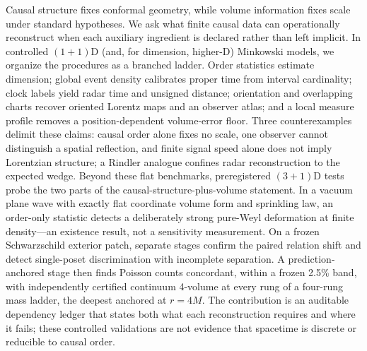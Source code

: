 


\begin{paperabstract}
Causal structure fixes conformal geometry, while volume information fixes
scale under standard hypotheses. We ask what finite causal data can
operationally reconstruct when each auxiliary ingredient is declared rather
than left implicit. In controlled $(1{+}1)$D (and, for dimension, higher-D)
Minkowski models, we organize the procedures as a branched ladder. Order
statistics estimate dimension; global event density calibrates proper time
from interval cardinality; clock labels yield radar time and unsigned
distance; orientation and overlapping charts recover oriented Lorentz maps
and an observer atlas; and a local measure profile removes a
position-dependent volume-error floor. Three counterexamples delimit these
claims: causal order alone fixes no scale, one observer cannot distinguish a
spatial reflection, and finite signal speed alone does not imply Lorentzian
structure; a Rindler analogue confines radar reconstruction to the expected
wedge. Beyond these flat benchmarks, preregistered $(3{+}1)$D tests probe the
two parts of the causal-structure-plus-volume statement. In a vacuum plane
wave with exactly flat coordinate volume form and sprinkling law, an
order-only statistic detects a deliberately strong pure-Weyl deformation at
finite density---an existence result, not a sensitivity measurement. On a
frozen Schwarzschild exterior patch, separate stages confirm the paired
relation shift and detect single-poset discrimination with incomplete
separation. A prediction-anchored stage then finds Poisson counts concordant,
within a frozen 2.5\% band, with independently certified continuum 4-volume
at every rung of a four-rung mass ladder, the deepest anchored at $r = 4M$.
The contribution is an auditable dependency ledger that states both what
each reconstruction requires and where it fails; these controlled
validations are not evidence that spacetime is discrete or reducible to
causal order.
\end{paperabstract}


